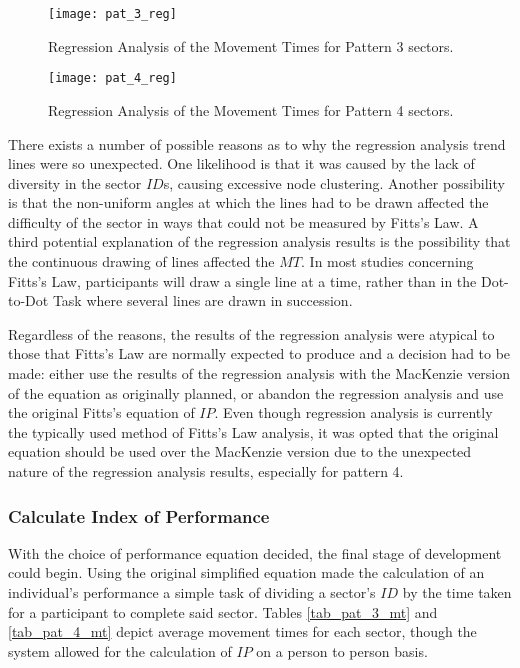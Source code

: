 			\begin{figure}[h]
				\centering
				\texttt{[image: pat\_3\_reg]}
				\caption{Regression Analysis of the Movement Times for Pattern 3 sectors.}
				\label{fig_pat_3_reg}
			\end{figure}
			
			\begin{figure}[]
				\centering
				\texttt{[image: pat\_4\_reg]}
				\caption{Regression Analysis of the Movement Times for Pattern 4 sectors.}
				\label{fig_pat_4_reg}
			\end{figure}
			
			There exists a number of possible reasons as to why the regression analysis trend lines were so unexpected. One likelihood is that it was caused by the lack of diversity in the sector \(ID\)s, causing excessive node clustering. Another possibility is that the non-uniform angles at which the lines had to be drawn affected the difficulty of the sector in ways that could not be measured by Fitts’s Law. A third potential explanation of the regression analysis results is the possibility that the continuous drawing of lines affected the \(MT\). In most studies concerning Fitts’s Law, participants will draw a single line at a time, rather than in the Dot-to-Dot Task where several lines are drawn in succession. 
		
			Regardless of the reasons, the results of the regression analysis were atypical to those that Fitts’s Law are normally expected to produce and a decision had to be made: either use the results of the regression analysis with the MacKenzie version of the equation as originally planned, or abandon the regression analysis and use the original Fitts’s equation of \(IP\). Even though regression analysis is currently the typically used method of Fitts’s Law analysis, it was opted that the original equation should be used over the MacKenzie version due to the unexpected nature of the regression analysis results, especially for pattern 4.
			
		\subsubsection{Calculate Index of Performance}
			With the choice of performance equation decided, the final stage of development could begin. Using the original simplified equation made the calculation of an individual's performance a simple task of dividing a sector’s \(ID\) by the time taken for a participant to complete said sector. Tables \ref{tab_pat_3_mt} and \ref{tab_pat_4_mt} depict average movement times for each sector, though the system allowed for the calculation of \(IP\) on a person to person basis.
			
